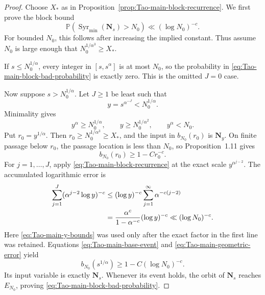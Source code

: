 \begin{proof}
Choose \(X_*\) as in
Proposition~\ref{prop:Tao-main-block-recurrence}.  We first prove the block
bound
\begin{equation}
\label{eq:Tao-main-block-bad-probability}
 \mathbb P(\operatorname{Syr}_{\min}(\mathbf N_s)>N_0)
 \ll(\log N_0)^{-c}.
\end{equation}
For bounded \(N_0\), this follows after increasing the implied constant.
Thus assume \(N_0\) is large enough that
\(N_0^{1/\alpha^3}\geq X_*\).

If \(s\leq N_0^{1/\alpha}\), every integer in
\([s,s^\alpha]\) is at most \(N_0\), so the probability in
\eqref{eq:Tao-main-block-bad-probability} is exactly zero.  This is the
omitted \(J=0\) case.

Now suppose \(s>N_0^{1/\alpha}\).  Let \(J\geq1\) be least such that
\[
 y=s^{\alpha^{-J}}<N_0^{1/\alpha}.
\]
Minimality gives
\begin{equation}
\label{eq:Tao-main-y-bounds}
 y^\alpha\geq N_0^{1/\alpha},
 \qquad y\geq N_0^{1/\alpha^2},
 \qquad y^\alpha<N_0.
\end{equation}
Put \(r_0=y^{1/\alpha}\).  Then
\(r_0\geq N_0^{1/\alpha^3}\geq X_*\), and the input in
\(b_{N_0}(r_0)\) is \(\mathbf N_y\).  On finite passage below \(r_0\),
the passage location is less than \(N_0\), so Proposition~1.11 gives
\begin{equation}
\label{eq:Tao-main-base-event}
 b_{N_0}(r_0)\geq1-Cr_0^{-c}.
\end{equation}
For \(j=1,\ldots,J\), apply
\eqref{eq:Tao-main-block-recurrence} at the exact scale
\(y^{\alpha^{j-2}}\).  The accumulated logarithmic error is
\begin{align}
 \sum_{j=1}^J
  (\alpha^{j-2}\log y)^{-c}
 &\leq (\log y)^{-c}
     \sum_{j=1}^{\infty}\alpha^{-c(j-2)}\notag\\
 &=\frac{\alpha^c}{1-\alpha^{-c}}(\log y)^{-c}
 \ll(\log N_0)^{-c}.
\label{eq:Tao-main-geometric-error}
\end{align}
Here \eqref{eq:Tao-main-y-bounds} was used only after the exact factor in
the first line was retained.  Equations
\eqref{eq:Tao-main-base-event} and
\eqref{eq:Tao-main-geometric-error} yield
\[
 b_{N_0}(s^{1/\alpha})\geq1-C(\log N_0)^{-c}.
\]
Its input variable is exactly \(\mathbf N_s\).  Whenever its event holds,
the orbit of \(\mathbf N_s\) reaches \(E_{N_0}\), proving
\eqref{eq:Tao-main-block-bad-probability}.


\end{proof}
